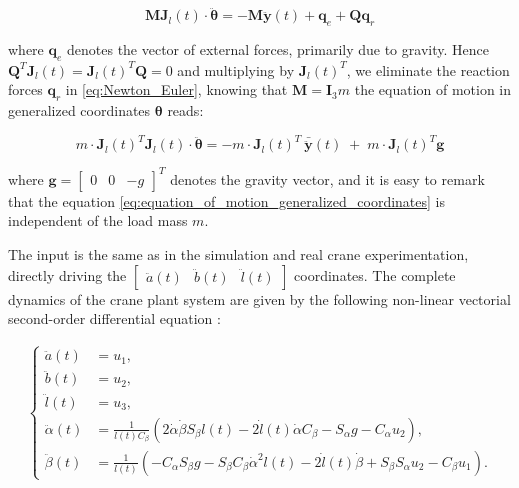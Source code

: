 \begin{equation}
    \label{eq:Newton_Euler}
    \boldsymbol{M} \boldsymbol{J}_{l}(t) \cdot \ddot{\boldsymbol{\theta}} = -\boldsymbol{M} \ddot{\boldsymbol{y}}(t) + \boldsymbol{q}_{e} + \boldsymbol{Q} \boldsymbol{q}_{r}
\end{equation}    

where \(\boldsymbol{q}_{e}\) denotes the vector of external forces, primarily due to gravity. 
Hence \(\boldsymbol{Q}^T\boldsymbol{J}_{l}(t) = \boldsymbol{J}_{l}(t)^T\boldsymbol{Q}= 0\) and 
multiplying by \(\boldsymbol{J}_{l}(t)^T\), we eliminate the reaction forces \(\boldsymbol{q}_r\) 
in \ref{eq:Newton_Euler}, knowing that \(\boldsymbol{M} = \boldsymbol{I}_3m\) the equation of motion in 
generalized coordinates \(\boldsymbol{\theta}\) reads:

\begin{equation}
    \label{eq:equation_of_motion_generalized_coordinates}
    m \cdot \boldsymbol{J}_{l}(t)^T\boldsymbol{J}_{l}(t)\cdot \ddot{\boldsymbol{\theta}} = - m \cdot\boldsymbol{J}_{l}(t)^T \: \bar{\ddot{\boldsymbol{y}}}(t) \; + \; m \cdot \boldsymbol{J}_{l}(t)^T\boldsymbol{g}
\end{equation}

where \(\boldsymbol{g} = \begin{bmatrix} 0 & 0 & -g\end{bmatrix}^T\) denotes the gravity vector, 
and it is easy to remark that the equation \ref{eq:equation_of_motion_generalized_coordinates} is 
independent of the load mass \(m\).

The input is the same as in the simulation and real crane experimentation, directly driving the 
\(\begin{bmatrix}\ddot{a}(t) & \ddot{b}(t) & \ddot{l}(t)\end{bmatrix}\) coordinates. The complete 
dynamics of the crane plant system are given by the following non-linear vectorial second-order differential 
equation \cite{Knierim2010Crane}:

\begin{align}
    \left\{ \begin{array}{ll}
    \ddot{a}(t) &= u_1, \\
    \ddot{b}(t) &= u_2, \\
    \ddot{l}(t) &= u_3, \\
    \ddot{\alpha}(t) &= \frac{1}{l(t) C_{\beta}} \left(2 \dot{\alpha} \dot{\beta} S_{\beta} l(t) - 2 \dot{l}(t) \dot{\alpha} C_{\beta} - S_{\alpha} g - C_{\alpha} u_2\right), \\
    \ddot{\beta}(t) &= \frac{1}{l(t)} \left(-C_{\alpha} S_{\beta} g - S_{\beta} C_{\beta} \dot{\alpha}^2 l(t) - 2 \dot{l}(t) \dot{\beta} + S_{\beta} S_{\alpha} u_2 - C_{\beta} u_1\right).
    \end{array}
    \right.
\end{align}

